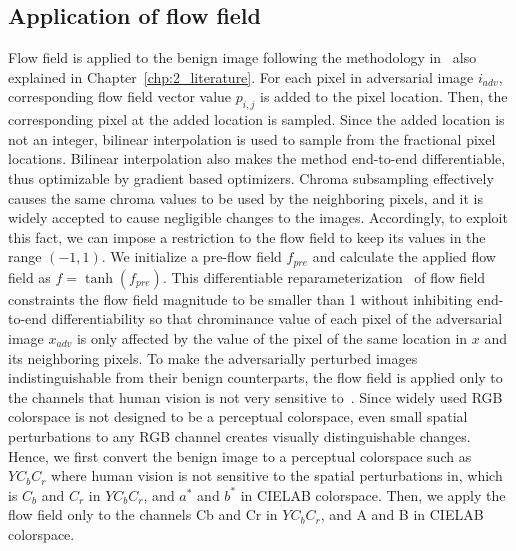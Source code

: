 \subsection{Application of flow field}
Flow field is applied to the benign image following the methodology in~\cite{xiao2018spatially} also explained in Chapter~\ref{chp:2_literature}. For each pixel in adversarial image \(i_{adv}\), corresponding flow field vector value \(p_{i,j}\) is added to the pixel location. Then, the corresponding pixel at the added location is sampled. Since the added location is not an integer, bilinear interpolation is used to sample from the fractional pixel locations. Bilinear interpolation also makes the method end-to-end differentiable, thus optimizable by gradient based optimizers.
Chroma subsampling effectively causes the same chroma values to be used by the neighboring pixels, and it is widely accepted to cause negligible changes to the images. Accordingly, to exploit this fact, we can impose a restriction to the flow field to keep its values in the range \((-1, 1)\). We initialize a pre-flow field \(f_{pre}\) and calculate the applied flow field as \(f = \tanh(f_{pre})\). This differentiable reparameterization~\cite{mordvintsev2018differentiable} of flow field constraints the flow field magnitude to be smaller than 1 without inhibiting end-to-end differentiability so that chrominance value of each pixel of the adversarial image \(x_{adv}\) is only affected by the value of the pixel of the same location in \(x\) and its neighboring pixels. %
To make the adversarially perturbed images indistinguishable from their benign counterparts, the flow field is applied only to the channels that human vision is not very sensitive to~\cite{vorobyev2004ecology}. Since widely used RGB colorspace is not designed to be a perceptual colorspace, even small spatial perturbations to any RGB channel creates visually distinguishable changes. Hence, we first convert the benign image to a perceptual colorspace such as \(YC_{b}C_{r}\) where human vision is not sensitive to the spatial perturbations in, which is \(C_{b}\) and \(C_{r}\) in \(YC_{b}C_{r}\), and \(a^*\) and \(b^*\) in CIELAB colorspace. Then, we apply the flow field only to the channels Cb and Cr in \(YC_{b}C_{r}\), and A and B in CIELAB colorspace.




